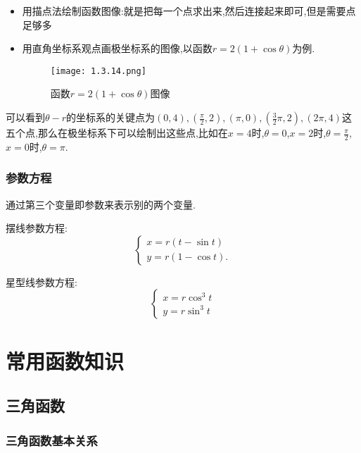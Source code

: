 \documentclass[12pt, a4paper, oneside, UTF8]{ctexbook}  %
\begin{document}
\begin{sloppypar}
    \begin{itemize}
        \item 用描点法绘制函数图像:就是把每一个点求出来,然后连接起来即可,但是需要点足够多
        \item 用直角坐标系观点画极坐标系的图像,以函数$r=2(1+\cos \theta )$为例.
              \begin{figure}[H]
                  \centering \texttt{[image: 1.3.14.png]} \caption{函数$r=2(1+\cos \theta)$图像}
              \end{figure}
    \end{itemize}
    可以看到$\theta - r $的坐标系的关键点为$(0,4),(\frac{\pi}{2},2),(\pi,0),(\frac{3}{2}\pi,2),(2\pi,4)$这五个点,那么在极坐标系下可以绘制出这些点,比如在$x=4$时,$\theta = 0$,$x=2$时,$\theta = \frac{\pi}{2}$,$x=0$时,$\theta = \pi$.
    \subsubsection{参数方程}
    通过第三个变量即参数来表示别的两个变量.

    摆线参数方程:
    $$
        \left\{
        \begin{array}{l}
            x=r\left(t-\sin t\right) \\
            y=r\left(1-\cos t\right).
        \end{array}
        \right.
    $$

    星型线参数方程:
    $$
        \left\{
        \begin{array}{l}
            x=r \cos^3 t \\
            y=r \sin^3 t
        \end{array}
        \right.
    $$
    \section{常用函数知识}
    \subsection{三角函数}
    \subsubsection{三角函数基本关系}
    \begin{center}
    \end{center}

\end{sloppypar}
\end{document}
